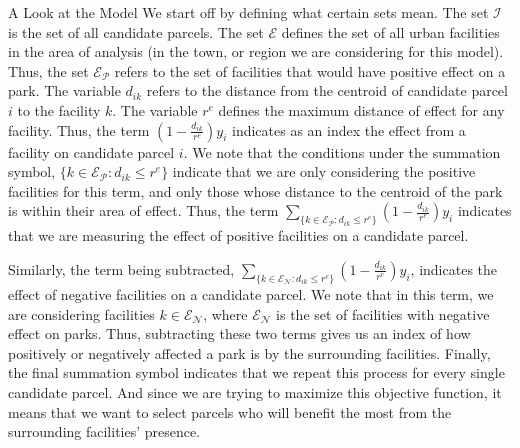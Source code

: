 \documentclass[12pt]{pom_thesis}
\theoremstyle{definition}
\begin{document}
\begin{chapter}{A Look at the Model}
	We start off by defining what certain sets mean. The set $\mathcal{I}$ is the set of all candidate parcels. The set $\mathcal{E}$ defines the set of all urban facilities in the area of analysis (in the town, or region we are considering for this model). Thus, the set $\mathcal{E_P}$ refers to the set of facilities that would have positive effect on a park. The variable $d_{ik}$ refers to the distance from the centroid of candidate parcel $i$ to the facility $k$. The variable $r^e$ defines the maximum distance of effect for any facility. Thus, the term $ \left( 1-\frac{d_{ik}}{r^e} \right) y_i$ indicates as an index the effect from a facility on candidate parcel $i$. We note that the conditions under the summation symbol, $\{k \in \mathcal{E_P}: d_{ik} \leq r^e  \}$ indicate that we are only considering the positive facilities for this term, and only those whose distance to the centroid of the park is within their area of effect. Thus, the term $\sum_{\{k \in \mathcal{E_P}: d_{ik} \leq r^e  \}} \left( 1-\frac{d_{ik}}{r^e} \right) y_i$ indicates that we are measuring the effect of positive facilities on a candidate parcel. 
	
	Similarly, the term being subtracted, $ \sum_{\{k \in \mathcal{E_N}: d_{ik} \leq r^e  \}} \left( 1-\frac{d_{ik}}{r^e} \right) y_i  $, indicates the effect of negative facilities on a candidate parcel. We note that in this term, we are considering facilities $k \in \mathcal{E_N}$, where $\mathcal{E_N}$ is the set of facilities with negative effect on parks. Thus, subtracting these two terms gives us an index of how positively or negatively affected a park is by the surrounding facilities. Finally, the final summation symbol indicates that we repeat this process for every single candidate parcel. And since we are trying to maximize this objective function, it means that we want to select parcels who will benefit the most from the surrounding facilities' presence. \\


\end{chapter}
\end{document}
